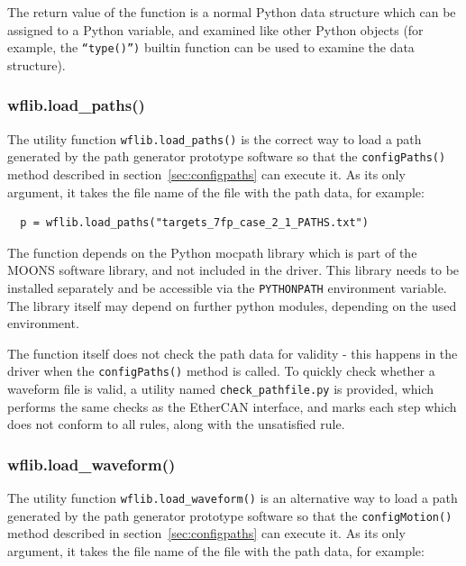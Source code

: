 \documentclass[11pt,a4paper]{scrartcl}
\begin{document}
The return value of the function is a normal Python data structure
which can be assigned to a Python variable, and examined like other
Python objects (for example, the \texttt{``type()'')} builtin function
can be used to examine the data structure).

\subsubsection{wflib.load\_paths()}
%
%
%
%
The utility function \texttt{wflib.load\_paths()} is the correct way
to load a path generated by the path generator prototype software so
that the \texttt{configPaths()} method described in
section~\ref{sec:configpaths} can execute it. As its only
argument, it takes the file name of the file with the path
data, for example:

\begin{verbatim}
  p = wflib.load_paths("targets_7fp_case_2_1_PATHS.txt")
\end{verbatim}

The function depends on the Python mocpath library which is part of
the MOONS software library, and not included in the driver.  This
library needs to be installed separately and be accessible via the
\texttt{PYTHONPATH} environment variable. The library itself may
depend on further python modules, depending on the used environment.

%

The function itself does not check the path data for validity - this
happens in the driver when the \texttt{configPaths()} method is
called. To quickly check whether a waveform file is valid, a utility
named \texttt{check\_pathfile.py} is provided, which performs the same
checks as the EtherCAN interface, and marks each step which does not conform to
all rules, along with the unsatisfied rule.


\subsubsection{wflib.load\_waveform()}
%
%
%
The utility function \texttt{wflib.load\_waveform()} is an alternative
way to load a path generated by the path generator prototype software
so that the \texttt{configMotion()} method described in
section~\ref{sec:configpaths} can execute it. As its only argument, it
takes the file name of the file with the path data, for example:
\end{document}
